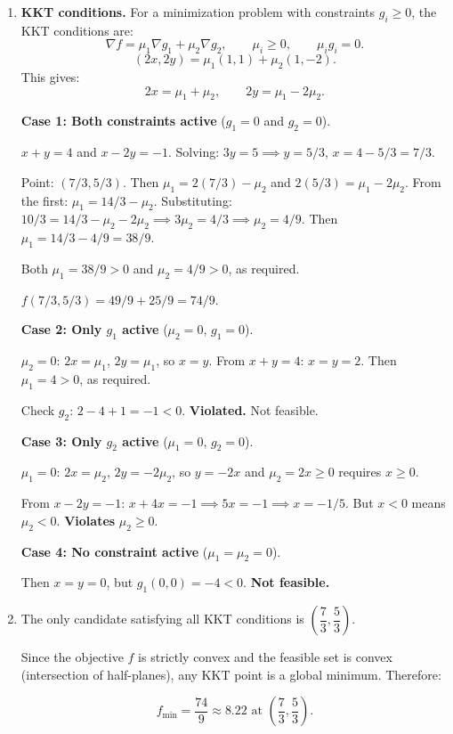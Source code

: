 \begin{enumerate}
\begin{enumerate}
    \item \textbf{KKT conditions.} For a minimization problem with constraints $g_i \geq 0$, the KKT conditions are:
    \[
    \nabla f = \mu_1 \nabla g_1 + \mu_2 \nabla g_2, \qquad \mu_i \geq 0, \qquad \mu_i g_i = 0.
    \]
    \[
    (2x, 2y) = \mu_1(1,1) + \mu_2(1,-2).
    \]
    This gives:
    \[
    2x = \mu_1 + \mu_2, \qquad 2y = \mu_1 - 2\mu_2.
    \]

    \textbf{Case 1: Both constraints active} ($g_1 = 0$ and $g_2 = 0$).

    $x + y = 4$ and $x - 2y = -1$. Solving: $3y = 5 \implies y = 5/3$, $x = 4 - 5/3 = 7/3$.

    Point: $(7/3, 5/3)$. Then $\mu_1 = 2(7/3) - \mu_2$ and $2(5/3) = \mu_1 - 2\mu_2$. From the first: $\mu_1 = 14/3 - \mu_2$. Substituting: $10/3 = 14/3 - \mu_2 - 2\mu_2 \implies 3\mu_2 = 4/3 \implies \mu_2 = 4/9$. Then $\mu_1 = 14/3 - 4/9 = 38/9$.

    Both $\mu_1 = 38/9 > 0$ and $\mu_2 = 4/9 > 0$, as required.

    $f(7/3, 5/3) = 49/9 + 25/9 = 74/9$.

    \textbf{Case 2: Only $g_1$ active} ($\mu_2 = 0$, $g_1 = 0$).

    $\mu_2 = 0$: $2x = \mu_1$, $2y = \mu_1$, so $x = y$. From $x + y = 4$: $x = y = 2$. Then $\mu_1 = 4 > 0$, as required.

    Check $g_2$: $2 - 4 + 1 = -1 < 0$. \textbf{Violated.} Not feasible.

    \textbf{Case 3: Only $g_2$ active} ($\mu_1 = 0$, $g_2 = 0$).

    $\mu_1 = 0$: $2x = \mu_2$, $2y = -2\mu_2$, so $y = -2x$ and $\mu_2 = 2x \geq 0$ requires $x \geq 0$.

    From $x - 2y = -1$: $x + 4x = -1 \implies 5x = -1 \implies x = -1/5$. But $x < 0$ means $\mu_2 < 0$. \textbf{Violates} $\mu_2 \geq 0$.

    \textbf{Case 4: No constraint active} ($\mu_1 = \mu_2 = 0$).

    Then $x = y = 0$, but $g_1(0,0) = -4 < 0$. \textbf{Not feasible.}

    \item The only candidate satisfying all KKT conditions is $\left(\dfrac{7}{3}, \dfrac{5}{3}\right)$.

    Since the objective $f$ is strictly convex and the feasible set is convex (intersection of half-planes), any KKT point is a global minimum. Therefore:

    \[
    \boxed{f_{\min} = \frac{74}{9} \approx 8.22 \text{ at } \left(\frac{7}{3}, \frac{5}{3}\right).}
    \]
\end{enumerate}

\end{enumerate}
